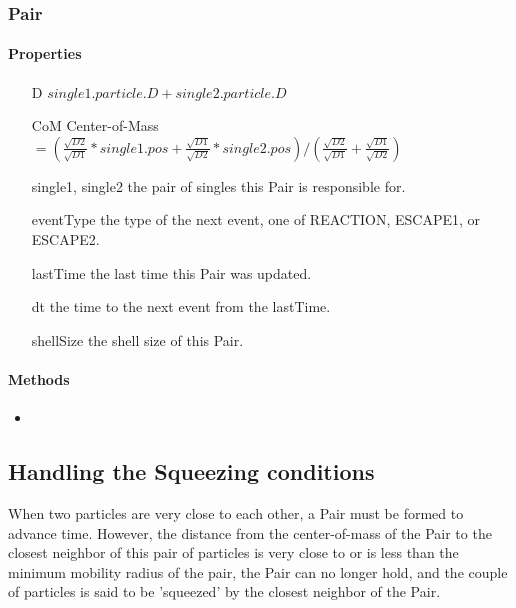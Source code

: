 \documentclass[english]{article}
\begin{document}
\subsubsection{Pair}

\paragraph{Properties}

\begin{itemize}
\item[D] $single1.particle.D + single2.particle.D$


\item[CoM] Center-of-Mass  
  $= ( \frac{\sqrt{D2}}{\sqrt{D1}} * single1.pos +
  \frac{\sqrt{D1}}{\sqrt{D2}} * single2.pos ) / (
  \frac{\sqrt{D2}}{\sqrt{D1}}+\frac{\sqrt{D1}}{\sqrt{D2}})$

\item[single1, single2] the pair of singles this Pair is responsible for.


\item[eventType] the type of the next event, one of REACTION,
  ESCAPE1, or ESCAPE2.

\item[lastTime] the last time this Pair was updated.

\item[dt] the time to the next event from the lastTime.

\item[shellSize] the shell size of this Pair.

\end{itemize}

\paragraph{Methods}

\begin{itemize}
\item 
\end{itemize}


\subsection{Handling the Squeezing conditions}

When two particles are very close to each other, a Pair must be formed
to advance time.  However, the distance from the center-of-mass of the
Pair to the closest neighbor of this pair of particles is very close
to or is less than the minimum mobility radius of the pair, the Pair
can no longer hold, and the couple of particles is said to be 'squeezed'
by the closest neighbor of the Pair.
\end{document}
